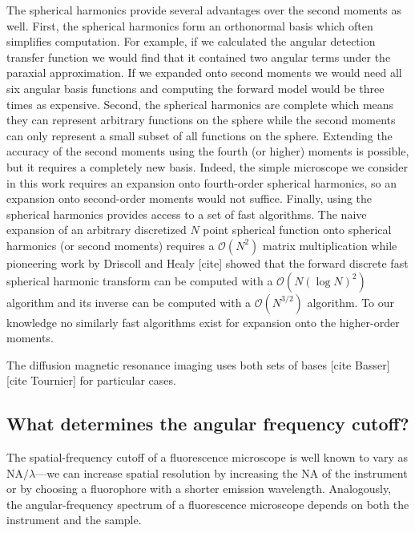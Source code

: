 \documentclass{osa-article}
\providecommand{\mc}[1]{\mathcal{#1}}
\begin{document}
The spherical harmonics provide several advantages over the second moments as
well. First, the spherical harmonics form an orthonormal basis which often
simplifies computation. For example, if we calculated the angular detection
transfer function we would find that it contained two angular terms under the
paraxial approximation. If we expanded onto second moments we would need all six
angular basis functions and computing the forward model would be three times as
expensive. Second, the spherical harmonics are complete which means they can
represent arbitrary functions on the sphere while the second moments can only
represent a small subset of all functions on the sphere. Extending the accuracy
of the second moments using the fourth (or higher) moments is possible, but it
requires a completely new basis. Indeed, the simple microscope we consider in
this work requires an expansion onto fourth-order spherical harmonics, so an
expansion onto second-order moments would not suffice. Finally, using the
spherical harmonics provides access to a set of fast algorithms. The naive
expansion of an arbitrary discretized $N$ point spherical function onto
spherical harmonics (or second moments) requires a $\mc{O}(N^2)$ matrix
multiplication while pioneering work by Driscoll and Healy [cite] showed that the
forward discrete fast spherical harmonic transform can be computed with a
$\mc{O}(N(\log N)^2)$ algorithm and its inverse can be computed with a
$\mc{O}(N^{3/2})$ algorithm. To our knowledge no similarly fast algorithms exist
for expansion onto the higher-order moments.

The diffusion magnetic resonance imaging uses both sets of bases [cite Basser]
[cite Tournier] for particular cases. 

\subsection{What determines the angular frequency cutoff?}
The spatial-frequency cutoff of a fluorescence microscope is well known to vary
as NA$/\lambda$---we can increase spatial resolution by increasing the NA of the
instrument or by choosing a fluorophore with a shorter emission wavelength.
Analogously, the angular-frequency spectrum of a fluorescence microscope depends
on both the instrument and the sample.
\end{document}
